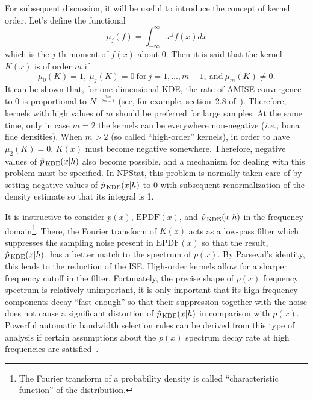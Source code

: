 \documentclass[12pt,titlepage]{article}
\newcommand{\sub}[1]{\ensuremath{_{\mbox{\scriptsize \,#1}}}}
\begin{document}
For subsequent discussion, it will be useful to introduce the concept
of kernel order. Let's define the functional
\begin{equation}
\mu_{j}(f) = \int_{-\infty}^{\infty} x^j f(x) dx
\label{eq:mufunct}
\end{equation}
which is the $j$-th moment of $f(x)$ about 0.
Then it is said that the kernel $K(x)$ is of order $m$ if
\begin{equation}
\mu_0(K) = 1, \ \mu_j(K) = 0 \ \mbox{for} \ j = 1, ..., m-1, \ \mbox{and} \ \mu_m(K) \ne 0.
\end{equation}
It can be shown that, for one-dimensional
KDE, the rate of AMISE convergence to 0 is proportional
to $N^{-\frac{2 m}{2 m + 1}}$ (see, for example, section~2.8
of~\cite{ref:kernsmooth}). Therefore, kernels with high values
of $m$ should be preferred for large samples. At the same time,
only in case $m = 2$ the kernels can be everywhere non-negative
({\it i.e.,} bona fide densities).
When $m > 2$ (so called ``high-order'' kernels), in order to have
$\mu_2(K) = 0$, $K(x)$ must become negative somewhere.
Therefore, negative values of $\hat{p}\sub{KDE}(x|h)$ also
become possible, and a mechanism for dealing with this problem
must be specified. In NPStat, this problem is normally taken care
of by setting negative values of $\hat{p}\sub{KDE}(x|h)$ to 0
with subsequent renormalization of the density estimate so that its
integral is 1.

It is instructive to consider $p(x)$, $\mbox{EPDF}(x)$,
and $\hat{p}\sub{KDE}(x|h)$ in the frequency
domain\footnote{The Fourier transform of a
probability density is called ``characteristic function'' of the distribution.}. There, the Fourier
transform of $K(x)$ acts as a low-pass filter which suppresses the sampling
noise present in $\mbox{EPDF}(x)$ so that the result, $\hat{p}\sub{KDE}(x|h)$,
has a better match
to the spectrum of $p(x)$. By Parseval's identity, this
leads to the reduction of the ISE. High-order kernels allow
for a sharper frequency cutoff in the filter. Fortunately, the precise shape
of $p(x)$ frequency spectrum
is relatively
unimportant, it is only important that its high frequency components
decay ``fast enough'' so that their suppression together with the
noise does not cause a significant distortion of  $\hat{p}\sub{KDE}(x|h)$
in comparison with $p(x)$. Powerful automatic bandwidth selection rules
can be derived from this type of analysis if certain
assumptions about the $p(x)$ spectrum decay rate
at high frequencies are satisfied~\cite{ref:chiu2, ref:chiumultivar}.
\end{document}
